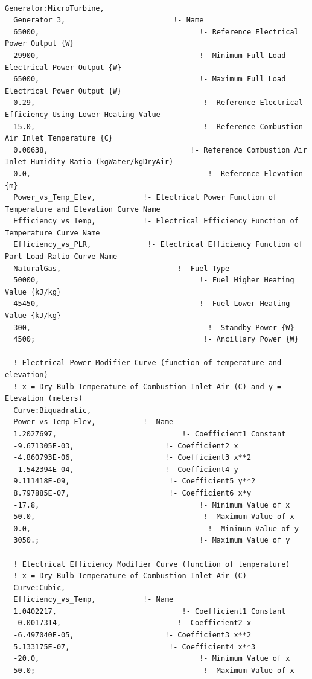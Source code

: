 \begin{lstlisting}

Generator:MicroTurbine,
  Generator 3,                         !- Name
  65000,                                     !- Reference Electrical Power Output {W}
  29900,                                     !- Minimum Full Load Electrical Power Output {W}
  65000,                                     !- Maximum Full Load Electrical Power Output {W}
  0.29,                                       !- Reference Electrical Efficiency Using Lower Heating Value
  15.0,                                       !- Reference Combustion Air Inlet Temperature {C}
  0.00638,                                 !- Reference Combustion Air Inlet Humidity Ratio (kgWater/kgDryAir)
  0.0,                                         !- Reference Elevation {m}
  Power_vs_Temp_Elev,           !- Electrical Power Function of Temperature and Elevation Curve Name
  Efficiency_vs_Temp,           !- Electrical Efficiency Function of Temperature Curve Name
  Efficiency_vs_PLR,             !- Electrical Efficiency Function of Part Load Ratio Curve Name
  NaturalGas,                           !- Fuel Type
  50000,                                     !- Fuel Higher Heating Value {kJ/kg}
  45450,                                     !- Fuel Lower Heating Value {kJ/kg}
  300,                                         !- Standby Power {W}
  4500;                                       !- Ancillary Power {W}

  ! Electrical Power Modifier Curve (function of temperature and elevation)
  ! x = Dry-Bulb Temperature of Combustion Inlet Air (C) and y = Elevation (meters)
  Curve:Biquadratic,
  Power_vs_Temp_Elev,           !- Name
  1.2027697,                             !- Coefficient1 Constant
  -9.671305E-03,                     !- Coefficient2 x
  -4.860793E-06,                     !- Coefficient3 x**2
  -1.542394E-04,                     !- Coefficient4 y
  9.111418E-09,                       !- Coefficient5 y**2
  8.797885E-07,                       !- Coefficient6 x*y
  -17.8,                                     !- Minimum Value of x
  50.0,                                       !- Maximum Value of x
  0.0,                                         !- Minimum Value of y
  3050.;                                     !- Maximum Value of y

  ! Electrical Efficiency Modifier Curve (function of temperature)
  ! x = Dry-Bulb Temperature of Combustion Inlet Air (C)
  Curve:Cubic,
  Efficiency_vs_Temp,           !- Name
  1.0402217,                             !- Coefficient1 Constant
  -0.0017314,                           !- Coefficient2 x
  -6.497040E-05,                     !- Coefficient3 x**2
  5.133175E-07,                       !- Coefficient4 x**3
  -20.0,                                     !- Minimum Value of x
  50.0;                                       !- Maximum Value of x


\end{lstlisting}
